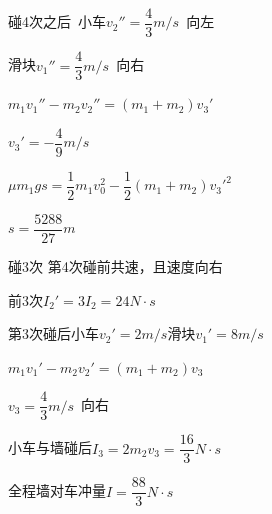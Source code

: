 \begin{problem}[21，15分]
\begin{solution}
碰4次之后\ 小车$v_2''=\dfrac{4}{3}\unit{m/s}$\ 向左

滑块$v_1''=\dfrac{4}{3}\unit{m/s}$\ 向右

$m_1v_1''-m_2v_2''=(m_1+m_2)v_3'$

$v_3'=-\dfrac{4}{9}\unit{m/s}$

$\mu m_1gs=\dfrac{1}{2}m_1v_0^2-\dfrac{1}{2}(m_1+m_2)v_3'^2$

$s=\dfrac{5288}{27}\unit{m}$


碰3次 第4次碰前共速，且速度向右

前3次\quad $I_2'=3I_2=24\unit{N\cdot s}$

第3次碰后\quad 小车$v_2'=2\unit{m/s}$\quad 滑块$v_1'=8\unit{m/s}$

$m_1v_1'-m_2v_2'=(m_1+m_2)v_3$

$v_3=\dfrac{4}{3}\unit{m/s}$\ 向右

小车与墙碰后\quad $I_3=2m_2v_3=\dfrac{16}{3}\unit{N\cdot s}$

全程墙对车冲量\quad $I=\dfrac{88}{3}\unit{N\cdot s}$
\end{solution}
\end{problem}
